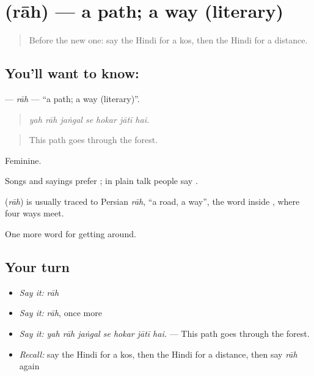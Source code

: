 \section[\texorpdfstring{\hi{राह} (rāh)}{राह (rāh)}]{ (rāh) — a path; a way (literary)}

\label{lesson:HI-C408-rah}



\begin{quote}
Before the new one: say the Hindi for a kos, then the Hindi for a distance.
\end{quote}

\subsection*{You'll want to know: }
\textbf{} — \emph{rāh} — \textquotedblleft{}a path; a way (literary)\textquotedblright{}.

\begin{quote}
      
\end{quote}

\begin{quote}
\emph{yah rāh jaṅgal se hokar jātī hai.}
\end{quote}

\begin{quote}
This path goes through the forest.
\end{quote}

Feminine.

Songs and sayings prefer ; in plain talk people say .

\begin{cousinweb}
\textbf{} (\emph{rāh}) is usually traced to Persian \emph{rāh}, \textquotedblleft{}a road, a way\textquotedblright{}, the word inside , where four ways meet.
\end{cousinweb}

\begin{grammarlens}[title={What you've built}]
One more word for getting around.
\end{grammarlens}

\subsection*{Your turn}
\begin{itemize}
\raggedright
  \item \emph{Say it:} \emph{rāh}
  \item \emph{Say it:} \emph{rāh}, once more
  \item \emph{Say it:} \emph{yah rāh jaṅgal se hokar jātī hai.} — This path goes through the forest.
  \item \emph{Recall:} say the Hindi for a kos, then the Hindi for a distance, then say \emph{rāh} again
\end{itemize}

